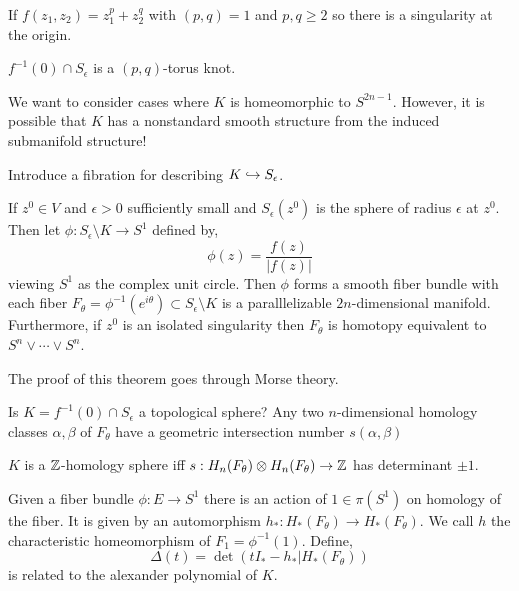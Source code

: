 \documentclass[12pt]{article}
\begin{document}
\begin{example}
If $f(z_1, z_2) = z_1^p  + z_2^q$ with $(p,q) = 1$ and $p,q \ge 2$ so there is a singularity at the origin.
\end{example} 

\begin{prop}[Brauner]
$f^{-1}(0) \cap S_\epsilon$ is a $(p,q)$-torus knot.
\end{prop}

\begin{rmk}
We want to consider cases where $K$ is homeomorphic to $S^{2n-1}$. However, it is possible that $K$ has a nonstandard smooth structure from the induced submanifold structure!
\end{rmk}
\noindent
Introduce a fibration for describing $K \hookrightarrow S_\epsilon$.

\begin{thm}[Milnor]
If $z^0 \in V$ and $\epsilon > 0$ sufficiently small and $S_\epsilon(z^0)$ is the sphere of radius $\epsilon$ at $z^0$. Then let $\phi : S_\epsilon \setminus K \to S^1$ defined by,
\[ \phi(z) = \frac{f(z)}{|f(z)|} \] 
viewing $S^1$ as the complex unit circle. Then $\phi$ forms a smooth fiber bundle with each fiber $F_{\theta} = \phi^{-1}(e^{i \theta}) \subset S_\epsilon \setminus K$ is a paralllelizable $2n$-dimensional manifold.
\bigskip\\
Furthermore, if $z^0$ is an isolated singularity then $F_\theta$ is homotopy equivalent to $S^n \vee \cdots \vee S^n$.
\end{thm}

\begin{rmk}
The proof of this theorem goes through Morse theory.
\end{rmk}

\begin{rmk}
Is $K = f^{-1}(0) \cap S_\epsilon$ a topological sphere? Any two $n$-dimensional homology classes $\alpha, \beta$ of $F_{\theta}$ have a geometric intersection number $s(\alpha, \beta)$
\end{rmk}

\begin{lemma}
$K$ is a $\mathbb{Z}$-homology sphere iff $s : H_n(F_\theta) \otimes H_n(F_\theta) \to \mathbb{Z}$ has determinant $\pm 1$. 
\end{lemma}

\begin{rmk}
Given a fiber bundle $\phi : E \to S^1$ there is an action of $1 \in \pi(S^1)$ on homology of the fiber. It is given by an automorphism $h_* : H_*(F_\theta) \to H_*(F_\theta)$. We call $h$ the characteristic homeomorphism of $F_1 = \phi^{-1}(1)$. Define,
\[ \Delta(t) = \det{(t I_* - h_* | H_*(F_\theta))} \] 
is related to the alexander polynomial of $K$. 
\end{rmk}
\end{document}
